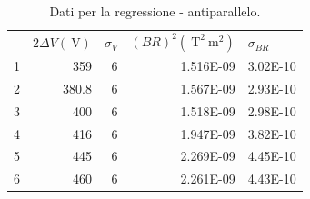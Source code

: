 \documentclass[a4paper,11pt]{article}
\begin{document}
		\begin{table}[]
			\centering
			\caption{Dati per la regressione - antiparallelo.}
			\label{retta_parall}
			\begin{tabular}{rrrrr}
				\rowcolor[HTML]{BBDAFF} 
				\multicolumn{1}{l}{\cellcolor[HTML]{BBDAFF}} & $2\Delta V (\SI{}{\volt})$ & \multicolumn{1}{l}{\cellcolor[HTML]{BBDAFF}$\sigma_V$} & \multicolumn{1}{l}{\cellcolor[HTML]{BBDAFF}$(B R)^2 (\SI{}{\tesla}^2\SI{}{\meter}^2)$} & \multicolumn{1}{l}{\cellcolor[HTML]{BBDAFF}$\sigma_{BR}$} \\
				\rowcolor[HTML]{C0C0C0} 
				\cellcolor[HTML]{BBDAFF}1                    & 359                        & 6                                                      & 1.516E-09                                                                              & 3.02E-10                                                  \\
				\rowcolor[HTML]{EFEFEF} 
				\cellcolor[HTML]{BBDAFF}2                    & 380.8                      & 6                                                      & 1.567E-09                                                                              & 2.93E-10                                                  \\
				\rowcolor[HTML]{C0C0C0} 
				\cellcolor[HTML]{BBDAFF}3                    & 400                        & 6                                                      & 1.518E-09                                                                              & 2.98E-10                                                  \\
				\rowcolor[HTML]{EFEFEF} 
				\cellcolor[HTML]{BBDAFF}4                    & 416                        & 6                                                      & 1.947E-09                                                                              & 3.82E-10                                                  \\
				\rowcolor[HTML]{C0C0C0} 
				\cellcolor[HTML]{BBDAFF}5                    & 445                        & 6                                                      & 2.269E-09                                                                              & 4.45E-10                                                  \\
				\rowcolor[HTML]{EFEFEF} 
				\cellcolor[HTML]{BBDAFF}6                    & 460                        & 6                                                      & 2.261E-09                                                                              & 4.43E-10                                                  \\

\end{tabular}
\end{table}
\end{document}
